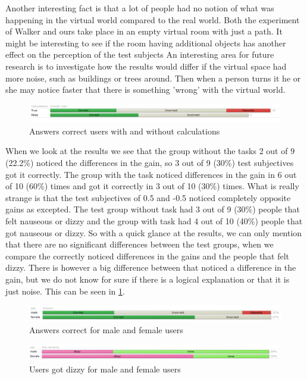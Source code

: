 Another interesting fact is that a lot of people had no notion of what was happening in the virtual world compared to the real world.
Both the experiment of Walker \cite{jwalker} and ours take place in an empty virtual room with just a path.
It might be interesting to see if the room having additional objects has another effect on the perception of the test subjects
An interesting area for future research is to investigate how the results would differ if the virtual space had more noise, such as buildings or trees around.
Then when a person turns it he or she may notice faster that there is something 'wrong'  with the virtual world.

\begin{figure}[htb]
	\centering
	\includegraphics[width=\linewidth]{sections/finalreport/images/graph3.png}	
	\caption{Answers correct users with and without calculations}
	\label{fig:grp3}
\end{figure}

When we look at the results we see that the group without the tasks 2 out of 9 (22.2\%) noticed the differences in the gain, so 3 out of 9 (30\%)  test subjectives got it correctly.  
The group with the task noticed differences in the gain in 6 out of 10 (60\%) times and got it correctly in 3 out of 10 (30\%) times. 
What is really strange is that the test subjectives of 0.5 and -0.5 noticed completely opposite gains as excepted. 
The test group without task had 3 out of 9 (30\%) people that felt nauseous or dizzy and the group with task had 4 out of 10 (40\%) people that got nauseous or dizzy. 
So with a quick glance at the results, we can only mention that there are no significant differences between the test groups, when we compare the correctly noticed differences in the gains and the people that felt dizzy.
 There is however a big difference between that noticed a difference in the gain, but we do not know for sure if there is a logical explanation or that it is just noise.
 This can be seen in \ref{fig:grp3}.

\begin{figure}[htb]
	\centering
	\includegraphics[width=\linewidth]{sections/finalreport/images/graph5.png}	
	\caption{Answers correct for male and female users}
	\label{fig:grp4}
\end{figure}
\begin{figure}[htb]
	\centering
	\includegraphics[width=\linewidth]{sections/finalreport/images/graph4.png}	
	\caption{Users got dizzy for male and female users}
	\label{fig:grp5}
\end{figure}

